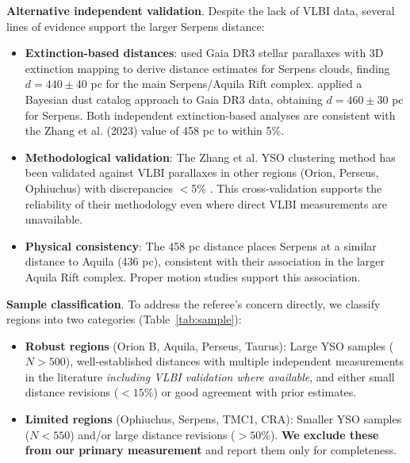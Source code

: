 \documentclass[twoside,twocolumn]{mnras}
\begin{document}
\textbf{Alternative independent validation}. Despite the lack of VLBI data, several lines of evidence support the larger Serpens distance:
\begin{itemize}
    \item \textbf{Extinction-based distances}: \citet{Yan2022} used Gaia DR3 stellar parallaxes with 3D extinction mapping to derive distance estimates for Serpens clouds, finding $d = 440 \pm 40$ pc for the main Serpens/Aquila Rift complex. \citet{Green2024} applied a Bayesian dust catalog approach to Gaia DR3 data, obtaining $d = 460 \pm 30$ pc for Serpens. Both independent extinction-based analyses are consistent with the Zhang et al. (2023) value of 458 pc to within 5\%.
    \item \textbf{Methodological validation}: The Zhang et al. YSO clustering method has been validated against VLBI parallaxes in other regions (Orion, Perseus, Ophiuchus) with discrepancies $<$5\% \citep[see Figure 12 in][]{Zhang2023}. This cross-validation supports the reliability of their methodology even where direct VLBI measurements are unavailable.
    \item \textbf{Physical consistency}: The 458 pc distance places Serpens at a similar distance to Aquila (436 pc), consistent with their association in the larger Aquila Rift complex. Proper motion studies \citep[e.g.][]{Zucker2020} support this association.
\end{itemize}

\textbf{Sample classification}. To address the referee's concern directly, we classify regions into two categories (Table~\ref{tab:sample}):
\begin{itemize}
    \item \textbf{Robust regions} (Orion B, Aquila, Perseus, Taurus): Large YSO samples ($N > 500$), well-established distances with multiple independent measurements in the literature \emph{including VLBI validation where available}, and either small distance revisions ($<15\%$) or good agreement with prior estimates.
    \item \textbf{Limited regions} (Ophiuchus, Serpens, TMC1, CRA): Smaller YSO samples ($N < 550$) and/or large distance revisions ($>50\%$). \textbf{We exclude these from our primary measurement} and report them only for completeness.
\end{itemize}
\end{document}
